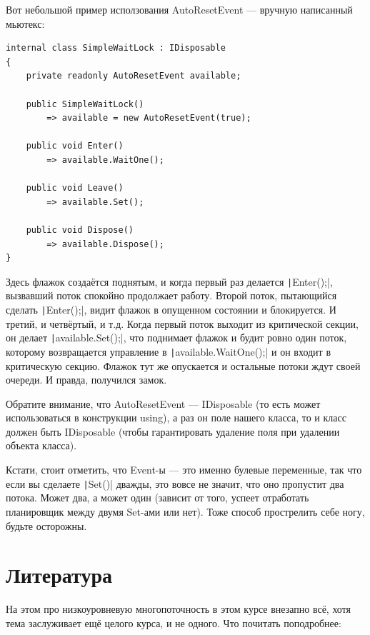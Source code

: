 \documentclass[a5paper]{article}
\begin{document}
Вот небольшой пример исползования AutoResetEvent --- вручную написанный мьютекс:

\begin{verbatim}
internal class SimpleWaitLock : IDisposable 
{
    private readonly AutoResetEvent available;
    
    public SimpleWaitLock() 
        => available = new AutoResetEvent(true); 

    public void Enter() 
        => available.WaitOne();

    public void Leave() 
        => available.Set();

    public void Dispose() 
        => available.Dispose();
}
\end{verbatim}

Здесь флажок создаётся поднятым, и когда первый раз делается \texttt|Enter();|, вызвавший поток спокойно продолжает работу. Второй поток, пытающийся сделать \texttt|Enter();|, видит флажок в опущенном состоянии и блокируется. И третий, и четвёртый, и т.д. Когда первый поток выходит из критической секции, он делает \texttt|available.Set();|, что поднимает флажок и будит ровно один поток, которому возвращается управление в \texttt|available.WaitOne();| и он входит в критическую секцию. Флажок тут же опускается и остальные потоки ждут своей очереди. И правда, получился замок. 

Обратите внимание, что AutoResetEvent --- IDisposable (то есть может использоваться в конструкции using), а раз он поле нашего класса, то и класс должен быть IDisposable (чтобы гарантировать удаление поля при удалении объекта класса). 

Кстати, стоит отметить, что Event-ы --- это именно булевые переменные, так что если вы сделаете \texttt|Set()| дважды, это вовсе не значит, что оно пропустит два потока. Может два, а может один (зависит от того, успеет отработать планировщик между двумя Set-ами или нет). Тоже способ прострелить себе ногу, будьте осторожны.

\section{Литература}

На этом про низкоуровневую многопоточность в этом курсе внезапно всё, хотя тема заслуживает ещё целого курса, и не одного. Что почитать поподробнее:
\end{document}
